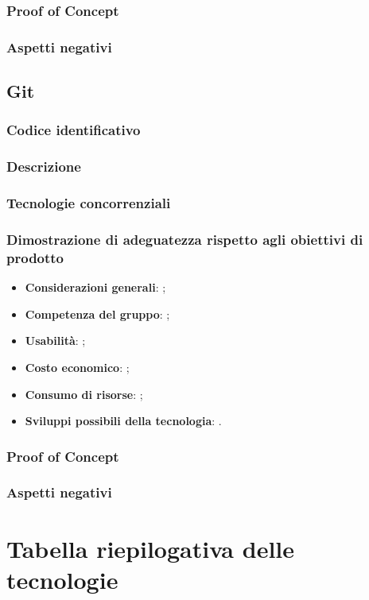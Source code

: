 \documentclass[./../Technology Baseline.tex]{subfiles}
\begin{document}
\subsubsection{Proof of Concept}
\subsubsection{Aspetti negativi}

\subsection{Git}

\subsubsection{Codice identificativo}
\subsubsection{Descrizione}
\subsubsection{Tecnologie concorrenziali}
\subsubsection{Dimostrazione di adeguatezza rispetto agli obiettivi di prodotto}
\begin{itemize}
	\item \textbf{Considerazioni generali}: ;
	\item \textbf{Competenza del gruppo}: ;
	\item \textbf{Usabilità}: ;
	\item \textbf{Costo economico}: ;
	\item \textbf{Consumo di risorse}: ;
	\item \textbf{Sviluppi possibili della tecnologia}: .
\end{itemize}
\subsubsection{Proof of Concept}
\subsubsection{Aspetti negativi}
\section{Tabella riepilogativa delle tecnologie}
\end{document}

